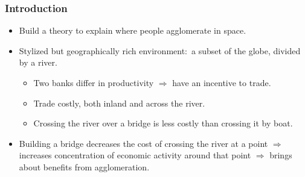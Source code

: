 \documentclass[compress,mathserif]{beamer}
\begin{document}
\begin{frame}%

\frametitle{Introduction}

\begin{itemize}
\item Build a theory to explain where people agglomerate in space.

\item Stylized but geographically rich environment:\ a subset of the globe,
divided by a river.

\begin{itemize}
\item Two banks differ in productivity $\Longrightarrow $ have an incentive
to trade.

\item Trade costly, both inland and across the river.

\item Crossing the river over a bridge is less costly than crossing it by
boat.
\end{itemize}

\item Building a bridge decreases the cost of crossing the river at a point $%
\Longrightarrow $ increases concentration of economic activity around that
point $\Longrightarrow $ brings about benefits from agglomeration.

\end{itemize}
\end{frame}
\end{document}

